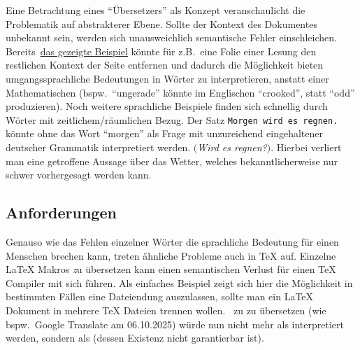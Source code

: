 Eine Betrachtung eines \enquote{Übersetzers} als Konzept veranschaulicht die Problematik auf abstrakterer Ebene. Sollte der Kontext des Dokumentes unbekannt sein, werden sich unausweichlich semantische Fehler einschleichen. Bereits~\hyperref[einleitung:hintergrund]{das gezeigte Beispiel} könnte für z.B.\ eine Folie einer Lesung den restlichen Kontext der Seite entfernen und dadurch die Möglichkeit bieten umgangssprachliche Bedeutungen in Wörter zu interpretieren, anstatt einer Mathematischen (bspw.\ \enquote{ungerade} könnte im Englischen \enquote{crooked}, statt \enquote{odd} produzieren). Noch weitere sprachliche Beispiele finden sich schnellig durch Wörter mit zeitlichem/räumlichen Bezug. Der Satz \texttt{Morgen wird es regnen.} könnte ohne das Wort \enquote{morgen} als Frage mit unzureichend eingehaltener deutscher Grammatik interpretiert werden. $($\textit{Wird es regnen?}$)$. Hierbei verliert man eine getroffene Aussage über das Wetter, welches bekanntlicherweise nur schwer vorhergesagt werden kann.%

\newpage
\subsection{Anforderungen}\label{einleitung:tex}
Genauso wie das Fehlen einzelner Wörter die sprachliche Bedeutung für einen Menschen brechen kann, treten ähnliche Probleme auch in \TeX{} auf. Einzelne \LaTeX{} Makros \textit zu übersetzen kann einen semantischen Verlust für einen \TeX{} Compiler mit sich führen. Als einfaches Beispiel zeigt sich hier die Möglichkeit in bestimmten Fällen eine Dateiendung auszulassen, sollte man ein \LaTeX{} Dokument in mehrere \TeX{} Dateien trennen wollen.\ \verb|| zu \verb|| zu übersetzen (wie bspw.\ Google Translate am 06.10.2025) würde nun nicht mehr als \verb|| interpretiert werden, sondern als \verb|| (dessen Existenz nicht garantierbar ist).\\\noindent 

